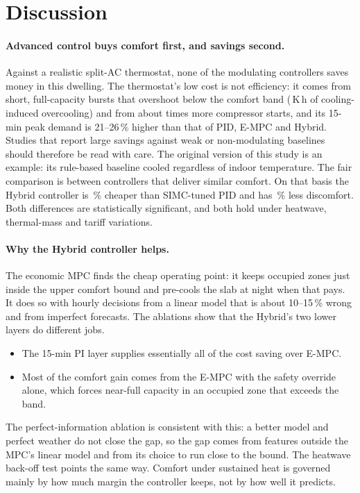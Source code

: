 \section{Discussion}\label{sec:discussion}

\paragraph{Advanced control buys comfort first, and savings second.}
Against a realistic split-AC thermostat, none of the modulating controllers saves money
in this dwelling. The thermostat's low cost is not efficiency: it comes from short,
full-capacity bursts that overshoot below the comfort band (\KhColdTh\,K\,h of
cooling-induced overcooling) and from about \StartsRatioTh{} times more compressor
starts, and its 15-min peak demand is 21--26\,\% higher than that of PID, E-MPC and
Hybrid. Studies that report large savings against weak or non-modulating baselines
should therefore be read with care. The original version of this study is an example:
its rule-based baseline cooled regardless of indoor temperature. The fair comparison is
between controllers that deliver similar comfort. On that basis the Hybrid controller
is \RelHybPidCost\,\% cheaper than SIMC-tuned PID and has \RelHybPidKh\,\% less
discomfort. Both differences are statistically significant, and both hold under
heatwave, thermal-mass and tariff variations.

\paragraph{Why the Hybrid controller helps.}
The economic MPC finds the cheap operating point: it keeps occupied zones just inside
the upper comfort bound and pre-cools the slab at night when that pays. It does so with
hourly decisions from a linear model that is about 10--15\,\% wrong and from imperfect
forecasts. The ablations show that the Hybrid's two lower layers do different jobs.
\begin{itemize}
  \item The 15-min PI layer supplies essentially all of the cost saving over E-MPC.
  \item Most of the comfort gain comes from the E-MPC with the safety override alone,
        which forces near-full capacity in an occupied zone that exceeds the band.
\end{itemize}
The perfect-information ablation is consistent with this: a better model and perfect
weather do not close the gap, so the gap comes from features outside the MPC's linear
model and from its choice to run close to the bound. The heatwave back-off test points
the same way. Comfort under sustained heat is governed mainly by how much margin the
controller keeps, not by how well it predicts.


